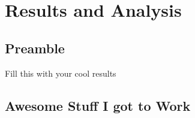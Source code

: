 \chapter{Results and Analysis}
\label{ch:results}
\glsresetall
\section*{Preamble}
Fill this with your cool results

\section{Awesome Stuff I got to Work}
\label{sec:pseudoframes}

